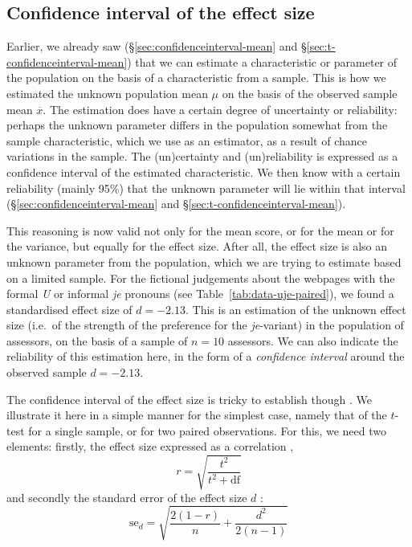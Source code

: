 \documentclass[
]{book}
\begin{document}
\hypertarget{sec:confint-effectsize}{%
\subsection{Confidence interval of the effect size}\label{sec:confint-effectsize}}

Earlier, we already saw
(§\ref{sec:confidenceinterval-mean} and
§\ref{sec:t-confidenceinterval-mean})
that we can estimate a characteristic
or parameter of the population on the basis of a characteristic
from a sample. This is how we estimated the unknown population mean \(\mu\)
on the basis of the observed sample mean
\(\overline{x}\). The estimation does have a certain degree of
uncertainty or reliability: perhaps the unknown parameter differs
in the population somewhat from the sample characteristic,
which we use as an estimator, as a result of chance variations in the
sample. The (un)certainty and (un)reliability is expressed as
a confidence interval of the estimated characteristic. We then know
with a certain reliability (mainly 95\%) that the unknown parameter
will lie within that interval
(§\ref{sec:confidenceinterval-mean} and §\ref{sec:t-confidenceinterval-mean}).

This reasoning is now valid not only for the mean score, or for the mean or for the
variance, but equally for the effect size. After all, the effect size
is also an unknown parameter from the population, which we are trying to estimate
based on a limited sample. For the fictional judgements
about the webpages with the formal \emph{U} or informal \emph{je} pronouns (see
Table~\ref{tab:data-uje-paired}), we found a standardised effect size
of \(d=-2.13\). This is an estimation of the unknown
effect size (i.e.~of the strength of the preference for the \emph{je}-variant)
in the population of assessors, on the basis of a sample of \(n=10\)
assessors. We can also indicate the reliability of this estimation
here, in the form of a \emph{confidence interval} around the
observed sample \(d=-2.13\).

The confidence interval of the effect size is tricky to establish though
\citep{Naka07, Chen15}. We illustrate it here in a simple manner for
the simplest case, namely that of the \(t\)-test for a single sample,
or for two paired observations. For this, we need two elements:
firstly, the effect size expressed as a correlation \citep[ p.359, formula 12.1]{Rose08}, \[r = \sqrt{ \frac{t^2}{t^2+\textrm{df}} }\] and secondly
the standard error of the effect size \(d\) \citep[ p.600,
formula 18]{Naka07}:\\
\begin{equation}
  \label{eq:d-paired-se}
    \textrm{se}_d = \sqrt{ \frac{2(1-r)}{n} + \frac{d^2}{2(n-1)} }
\end{equation}
\end{document}
